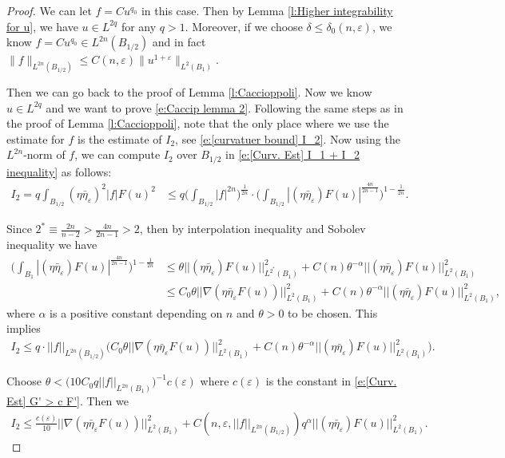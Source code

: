 \documentclass[11pt,reqno]{amsart}
\numberwithin{equation}{section}
\theoremstyle{definition}
\theoremstyle{remark}
\begin{document}
\begin{proof}
We can let $f=Cu^{q_0}$ in this case. Then by Lemma \ref{l:Higher integrability for u}, we have $u \in L^{2q}$ for any $q>1$. Moreover, if we choose $\delta\leqslant \delta_0(n,\varepsilon)$, we know $f=Cu^{q_0} \in L^{2n}(B_{1/2})$ and in fact $\|f\|_{L^{2n}(B_{1/2})} \leqslant C(n,\varepsilon)\|u^{1+\varepsilon}\|_{L^2(B_1)}$.

Then we can go back to the proof of Lemma \ref{l:Caccioppoli}. Now we know $u \in L^{2q}$ and we want to prove \eqref{e:Caccip lemma 2}. Following the same steps as in the proof of Lemma \ref{l:Caccioppoli}, note that the only place where we use the estimate for $f$ is the estimate of $I_2$, see \eqref{e:[curvatuer bound] I_2}. Now using the $L^{2n}$-norm of $f$, we can compute $I_2$ over $B_{1/2}$ in \eqref{e:[Curv. Est] I_1 + I_2 inequality} as follows:
\begin{align}
    I_2 = q \int_{B_{1/2}} (\eta \bar{\eta}_{\varepsilon})^2 |f| F(u)^2 &\leqslant q \Big(\int_{B_{1/2}} |f |^{2n} \Big)^{\frac1{2n}} \cdot \Big( \int_{B_{1/2}} |(\eta \bar{\eta}_{\varepsilon})F(u)|^{\frac{4n}{2n-1}}\Big)^{1- \frac1{2n}}.
\end{align}

Since $2^* \equiv \frac{2n}{n-2} > \frac{4n}{2n-1} > 2$, then by interpolation inequality and Sobolev inequality we have
\begin{align}
    \Big( \int_{B_1} |(\eta \bar{\eta}_{\varepsilon})F(u)|^{\frac{4n}{2n-1}}\Big)^{1- \frac1{2n}} &\leqslant \theta ||(\eta \bar{\eta}_{\varepsilon})F(u)||_{L^{2^*}(B_1)}^2 + C(n) \theta^{-\alpha} ||(\eta \bar{\eta}_{\varepsilon})F(u)||_{L^2(B_1)}^2 \\
    &\leqslant C_0 \theta ||\nabla (\eta \bar{\eta}_{\varepsilon} F(u))||_{L^{2}(B_1)}^2 + C(n) \theta^{-\alpha} ||(\eta \bar{\eta}_{\varepsilon})F(u)||_{L^2(B_1)}^2,
\end{align}
where $\alpha$ is a positive constant depending on $n$ and $\theta>0$ to be chosen. This implies
\begin{align}
    I_2 \leqslant q \cdot ||f||_{L^{2n}(B_{1/2})} \Big( C_0 \theta ||\nabla (\eta \bar{\eta}_{\varepsilon} F(u))||_{L^{2}(B_1)}^2 + C(n) \theta^{-\alpha} ||(\eta \bar{\eta}_{\varepsilon})F(u)||_{L^2(B_1)}^2 \Big).
\end{align}

Choose $\theta < \Big(10C_0 q ||f||_{L^{2n}(B_1)} \Big)^{-1} c(\varepsilon)$ where $c(\varepsilon)$ is the constant in \eqref{e:[Curv. Est] G' > c F'}. Then we 
\begin{align}
    I_2 \leqslant \frac{c(\varepsilon)}{10} ||\nabla (\eta \bar{\eta}_{\varepsilon} F(u))||_{L^{2}(B_1)}^2 + C(n,\varepsilon,||f||_{L^{2n}(B_{1/2})})q^{\alpha}||(\eta \bar{\eta}_{\varepsilon})F(u)||_{L^2(B_1)}^2.
\end{align}


\end{proof}
\end{document}
